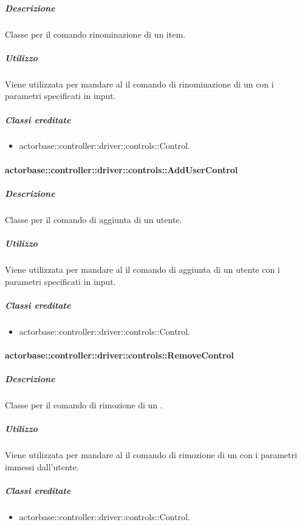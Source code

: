 \documentclass{scalatekids-article}
\begin{document}
\subparagraph{Descrizione}

Classe per il comando rinominazione di un item.

\subparagraph{Utilizzo}

Viene utilizzata per mandare al  il comando di rinominazione di
un  con i parametri specificati in input.

\subparagraph{Classi ereditate}

\begin{itemize}
\item actorbase::controller::driver::controls::Control.
\end{itemize}

\paragraph{actorbase::controller::driver::controls::AddUserControl}

\subparagraph{Descrizione}

Classe per il comando di aggiunta di un utente.

\subparagraph{Utilizzo}

Viene utilizzata per mandare al  il comando di aggiunta di un
utente con i parametri specificati in input.

\subparagraph{Classi ereditate}

\begin{itemize}
\item actorbase::controller::driver::controls::Control.
\end{itemize}

\paragraph{actorbase::controller::driver::controls::RemoveControl}

\subparagraph{Descrizione}

Classe per il comando di rimozione di un .

\subparagraph{Utilizzo}

Viene utilizzata per mandare al  il comando di rimozione di un
 con i parametri immessi dall'utente.

\subparagraph{Classi ereditate}

\begin{itemize}
\item actorbase::controller::driver::controls::Control.
\end{itemize}
\end{document}
